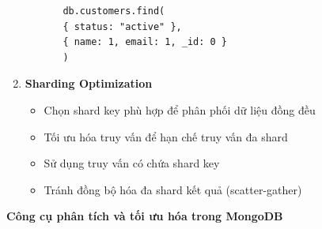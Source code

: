 \begin{enumerate}
\begin{enumerate}
\begin{enumerate}
        
\begin{lstlisting}[style=mongodb, caption=Ví dụ Multikey Index trong MongoDB, label=mongodb:example]
db.customers.find(
{ status: "active" },
{ name: 1, email: 1, _id: 0 }
)
\end{lstlisting}
        
        
        
        \end{enumerate}
    \end{enumerate}

    \item \textbf{Sharding Optimization}

        \begin{itemize}
            \item Chọn shard key phù hợp để phân phối dữ liệu đồng đều
            \item Tối ưu hóa truy vấn để hạn chế truy vấn đa shard
            \item Sử dụng truy vấn có chứa shard key
            \item Tránh đồng bộ hóa đa shard kết quả (scatter-gather)
        \end{itemize}
\end{enumerate}


\textbf{Công cụ phân tích và tối ưu hóa trong MongoDB}

